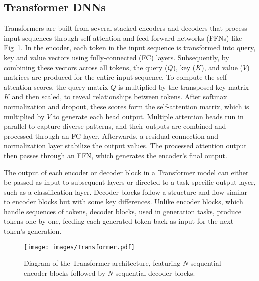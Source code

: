 
\subsection{Transformer DNNs}\label{subs:Transformers}
Transformers are built from several stacked encoders and decoders that process input sequences through self-attention and feed-forward networks (FFNs) like Fig~\ref{fig:Transformer}. In the encoder, each token in the input sequence is transformed into query, key and value vectors using fully-connected (FC) layers. Subsequently, by combining these vectors across all tokens, the query ($Q$), key ($K$), and value ($V$) matrices are produced for the entire input sequence. To compute the self-attention scores, the query matrix $Q$ is multiplied by the transposed key matrix $K$ and then scaled, to reveal relationships between tokens. After softmax normalization and dropout, these scores form the self-attention matrix, which is multiplied by $V$ to generate each head output. Multiple attention heads run in parallel to capture diverse patterns, and their outputs are combined and processed through an FC layer. Afterwards, a residual connection and normalization layer stabilize the output values. The processed attention output then passes through an FFN, which generates the encoder's final output.

The output of each encoder or decoder block in a Transformer model can either be passed as input to subsequent layers or directed to a task-specific output layer, such as a classification layer. Decoder blocks follow a structure and flow similar to encoder blocks but with some key differences. Unlike encoder blocks, which handle sequences of tokens, decoder blocks, used in generation tasks, produce tokens one-by-one, feeding each generated token back as input for the next token's generation.

\begin{figure}[t!]
    \centering
    \texttt{[image: images/Transformer.pdf]}
    \vskip -0.10in
    \caption{Diagram of the Transformer architecture, featuring $N$ sequential encoder blocks followed by $N$ sequential decoder blocks.}
    \label{fig:Transformer}
    \vskip -0.15in
\end{figure}
